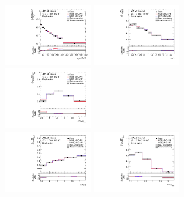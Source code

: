 \FloatBarrier

\begin{figure}[ht]
  \centering
  \includegraphics[width=0.33\textwidth]{figures/diff_xsec/normalized-unfolded-distributions/tty_prod_ljet/SL_tty_prod_pt_unfolded_normalized.pdf}%
  \includegraphics[width=0.33\textwidth]{figures/diff_xsec/normalized-unfolded-distributions/tty_prod_ljet/SL_tty_prod_eta_unfolded_normalized.pdf}%
  \includegraphics[width=0.33\textwidth]{figures/diff_xsec/normalized-unfolded-distributions/tty_prod_ljet/SL_tty_prod_drphb_unfolded_normalized.pdf}\\
  \includegraphics[width=0.33\textwidth]{figures/diff_xsec/normalized-unfolded-distributions/tty_prod_ljet/SL_tty_prod_drphl_unfolded_normalized.pdf}%
  \includegraphics[width=0.33\textwidth]{figures/diff_xsec/normalized-unfolded-distributions/tty_prod_ljet/SL_tty_prod_drlj_unfolded_normalized.pdf}%

\end{figure}
